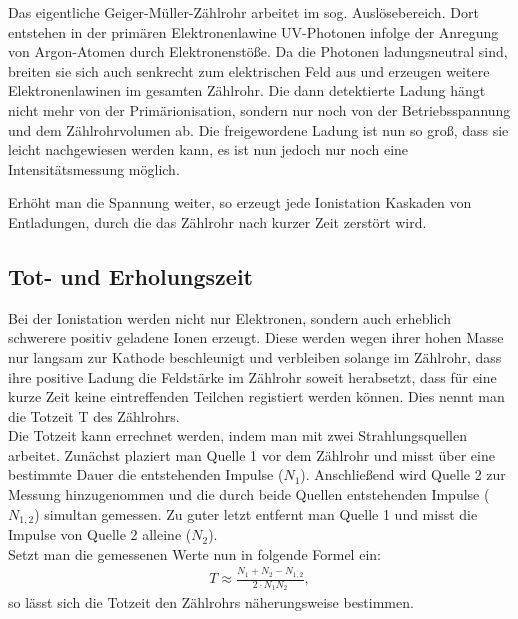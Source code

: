 Das eigentliche Geiger-Müller-Zählrohr arbeitet im sog. Auslösebereich. Dort entstehen in der primären Elektronenlawine UV-Photonen infolge der Anregung von Argon-Atomen durch Elektronenstöße. Da die Photonen ladungsneutral sind, breiten sie sich auch senkrecht zum elektrischen Feld aus und erzeugen weitere Elektronenlawinen im gesamten Zählrohr. Die dann detektierte Ladung hängt nicht mehr von der Primärionisation, sondern nur noch von der Betriebsspannung und dem Zählrohrvolumen ab. Die freigewordene Ladung ist nun so groß, dass sie leicht nachgewiesen werden kann, es ist nun jedoch nur noch eine Intensitätsmessung möglich.

Erhöht man die Spannung weiter, so erzeugt jede Ionistation Kaskaden von Entladungen, durch die das Zählrohr nach kurzer Zeit zerstört wird.

\subsection{Tot- und Erholungszeit}
\label{sec_totzeit}
Bei der Ionistation werden nicht nur Elektronen, sondern auch erheblich schwerere positiv geladene Ionen erzeugt. Diese werden wegen ihrer hohen Masse nur langsam zur Kathode beschleunigt und verbleiben solange im Zählrohr, dass ihre positive Ladung die Feldstärke im Zählrohr soweit herabsetzt, dass für eine kurze Zeit keine eintreffenden Teilchen registiert werden können. Dies nennt man die Totzeit T des Zählrohrs.\\
Die Totzeit kann errechnet werden, indem man mit zwei Strahlungsquellen arbeitet. Zunächst plaziert man Quelle 1 vor dem Zählrohr und misst über eine bestimmte Dauer die entstehenden Impulse ($N_1$). Anschließend wird Quelle 2 zur Messung hinzugenommen und die durch beide Quellen entstehenden Impulse ($N_{1,2}$) simultan gemessen. Zu guter letzt entfernt man Quelle 1 und misst die Impulse von Quelle 2 alleine ($N_2$).\\
Setzt man die gemessenen Werte nun in folgende Formel ein:
\begin{align}
T\approx \frac{N_1+ N_2 - N_{1,2}}{2\cdot N_1 N_2},
\label{eq_totzeit}
\end{align}
so lässt sich die Totzeit den Zählrohrs näherungsweise bestimmen.

